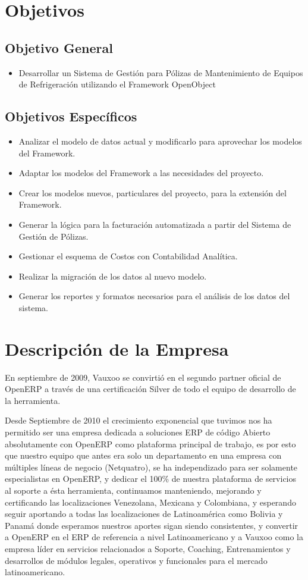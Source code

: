 \documentclass[a4paper, 12pt]{article}
\begin{document}
\section{Objetivos}
\subsection{Objetivo General}
\begin{itemize}
\item Desarrollar un Sistema de Gestión para Pólizas de Mantenimiento de Equipos de Refrigeración utilizando el Framework OpenObject
\end{itemize}

\subsection{Objetivos Específicos}
\begin{itemize}
\item Analizar el modelo de datos actual y modificarlo para aprovechar los modelos del Framework.
\item Adaptar los modelos del Framework a las necesidades del proyecto.
\item Crear los modelos nuevos, particulares del proyecto, para la extensión del Framework.
\item Generar la lógica para la facturación automatizada a partir del Sistema de Gestión de Pólizas.
\item Gestionar el esquema de Costos con Contabilidad Analítica.
\item Realizar la migración de los datos al nuevo modelo.
\item Generar los reportes y formatos necesarios para el análisis de los datos del sistema.
\end{itemize}
\newpage

\section{Descripción de la Empresa}
En septiembre de 2009, Vauxoo se convirtió en el segundo partner oficial de OpenERP a través de una certificación Silver de todo el equipo de desarrollo de la herramienta.

Desde Septiembre de 2010 el crecimiento exponencial que tuvimos nos ha permitido ser una empresa dedicada a soluciones ERP de código Abierto absolutamente con OpenERP como plataforma principal de trabajo, es por esto que nuestro equipo que antes era solo un departamento en una empresa con múltiples líneas de negocio (Netquatro), se ha independizado para ser solamente especialistas en OpenERP, y dedicar el 100\% de nuestra plataforma de servicios al soporte a ésta herramienta, continuamos manteniendo, mejorando y certificando las localizaciones Venezolana, Mexicana y Colombiana, y esperando seguir aportando a todas las localizaciones de Latinoamérica como Bolivia y Panamá donde esperamos nuestros aportes sigan siendo consistentes, y convertir a OpenERP en el ERP de referencia a nivel Latinoamericano y a Vauxoo como la empresa líder en servicios relacionados a Soporte, Coaching, Entrenamientos y desarrollos de módulos legales, operativos y funcionales para el mercado latinoamericano.
\end{document}

